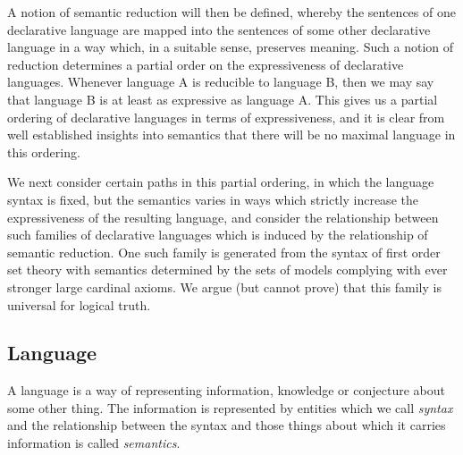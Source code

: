 A notion of semantic reduction will then be defined, whereby the sentences of one declarative language are mapped into the sentences of some other declarative language in a way which, in a suitable sense, preserves meaning.
Such a notion of reduction determines a partial order on the expressiveness of declarative languages.
Whenever language A is reducible to language B, then we may say that language B is at least as expressive as language A.
This gives us a partial ordering of declarative languages in terms of expressiveness, and it is clear from well established insights into semantics that there will be no maximal language in this ordering.

We next consider certain paths in this partial ordering, in which the language syntax is fixed, but the semantics varies in ways which strictly increase the expressiveness of the resulting language, and consider the relationship between such families of declarative languages which is induced by the relationship of semantic reduction.
One such family is generated from the syntax of first order set theory with semantics determined by the sets of models complying with ever stronger large cardinal axioms.
We argue (but cannot prove) that this family is universal for logical truth.

\subsection{Language}

A language
 is a way of representing information, knowledge or conjecture about some other thing.
The information is represented by entities which we call \emph{syntax} and the relationship between the syntax and those things about which it carries information is called \emph{semantics}.





